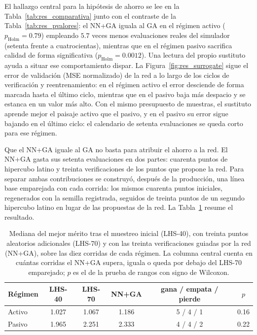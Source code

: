 El hallazgo central para la hipótesis de ahorro se lee en la Tabla~\ref{tab:res_comparativa}
junto con el contraste de la Tabla~\ref{tab:res_pvalores}: el NN+GA iguala al GA en el
régimen activo ($p_{\mathrm{Holm}}=0.79$) empleando $5{.}7$ veces menos evaluaciones
reales del simulador (setenta frente a cuatrocientas), mientras que en el régimen pasivo
sacrifica calidad de forma significativa ($p_{\mathrm{Holm}}=0.0012$). Una lectura del
propio sustituto ayuda a situar ese comportamiento dispar. La
Figura~\ref{fig:res_surrogate} sigue el error de validación (MSE normalizado) de la red
a lo largo de los ciclos de verificación y reentrenamiento: en el régimen activo el error
desciende de forma marcada hasta el último ciclo, mientras que en el pasivo baja más
despacio y se estanca en un valor más alto. Con el mismo presupuesto de muestras, el
sustituto aprende mejor el paisaje activo que el pasivo, y en el pasivo su error sigue
bajando en el último ciclo: el calendario de setenta evaluaciones se queda corto para
ese régimen.

Que el NN+GA iguale al GA no basta para atribuir el ahorro a la red. El NN+GA gasta sus
setenta evaluaciones en dos partes: cuarenta puntos de hipercubo latino y treinta
verificaciones de los puntos que propone la red. Para separar ambas contribuciones se
construyó, después de la producción, una línea base emparejada con cada corrida: los
mismos cuarenta puntos iniciales, regenerados con la semilla registrada, seguidos de
treinta puntos de un segundo hipercubo latino en lugar de las propuestas de la red. La
Tabla~\ref{tab:res_lhs70} resume el resultado.

\begin{table}[t]
  \centering\small
  \caption[Aporte del sustituto frente a un muestreo del mismo costo]{Mediana del
  mejor mérito tras el muestreo inicial (LHS-40), con treinta puntos aleatorios
  adicionales (LHS-70) y con las treinta verificaciones guiadas por la red (NN+GA),
  sobre las diez corridas de cada régimen. La columna central cuenta en cuántas
  corridas el NN+GA supera, iguala o queda por debajo del LHS-70 emparejado; $p$ es el
  de la prueba de rangos con signo de Wilcoxon.}
  \label{tab:res_lhs70}
  \begin{tabular}{lccccc}
    \hline
    Régimen & LHS-40 & LHS-70 & NN+GA & gana / empata / pierde & $p$ \\
    \hline
    Activo & 1.027 & 1.067 & 1.186 & 5 / 4 / 1 & 0.16 \\
    Pasivo & 1.965 & 2.251 & 2.333 & 4 / 4 / 2 & 0.22 \\
    \hline
  \end{tabular}
\end{table}

